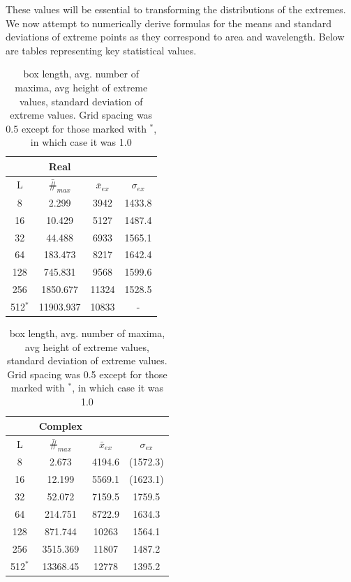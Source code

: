 \documentclass[12pt]{article}
\begin{document}
These values will be essential to transforming the distributions of the extremes. We now attempt to numerically derive formulas for the means and standard deviations of extreme points as they correspond to area and wavelength. Below are tables representing key statistical values.

\begin{table}[hpt]
\centering
\begin{tabular}{|c|c|c|c|}
 & Real & & \\
 \hline
 L & $\bar{\#}_{max}$ & $\bar{x}_{ex}$ & $\sigma_{ex}$ \\
 \hline
 8 & 2.299 & 3942 & 1433.8\\
 16 & 10.429 & 5127 & 1487.4\\
 32 & 44.488 & 6933 & 1565.1\\
 64 & 183.473 & 8217 & 1642.4\\
 128 & 745.831 & 9568 & 1599.6\\
 256 & 1850.677 & 11324 & 1528.5\\
 512$^{*}$ & 11903.937 & 10833 & -\\
\hline
\end{tabular}
\caption{box length, avg. number of maxima, avg height of extreme values, standard deviation of extreme values. Grid spacing was 0.5 except for those marked with $^{*}$, in which case it was 1.0}
\end{table}

\begin{table}[hpt]
\centering
\begin{tabular}{|c|c|c|c|}
 & Complex & & \\
 \hline
 L & $\bar{\#}_{max}$ & $\bar{x}_{ex}$ & $\sigma_{ex}$ \\
 \hline
 8 & 2.673 & 4194.6 & (1572.3)\\
 16 & 12.199 & 5569.1 & (1623.1)\\
 32 & 52.072 & 7159.5 & 1759.5\\
 64 & 214.751 & 8722.9 & 1634.3\\
 128 & 871.744 & 10263 & 1564.1\\
 256 & 3515.369 & 11807 & 1487.2\\
 512$^{*}$ & 13368.45 & 12778 & 1395.2\\
\hline
\end{tabular}
\caption{box length, avg. number of maxima, avg height of extreme values, standard deviation of extreme values. Grid spacing was 0.5 except for those marked with $^{*}$, in which case it was 1.0}
\end{table}
\end{document}
